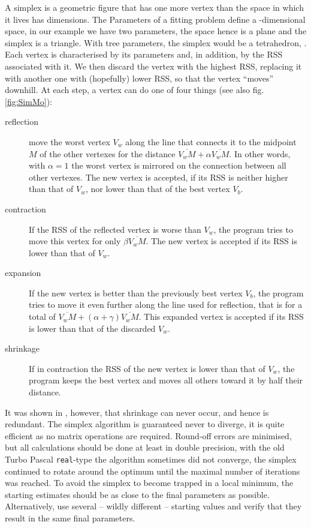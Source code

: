 \begin{refsection}
A simplex is a geometric figure that has one more vertex than the space in which it lives has dimensions. The  Parameters of a fitting problem define a -dimensional space, in our example we have two parameters, the space hence is a plane and the simplex is a triangle. With tree parameters, the simplex would be a tetrahedron, . Each vertex is characterised by its parameters and, in addition, by the \acs{RSS} associated with it. We then discard the vertex with the highest \acs{RSS}, replacing it with another one with (hopefully) lower \acs{RSS}, so that the vertex ``moves'' downhill. At each step, a vertex can do one of four things (see also fig. \ref{fig:SimMo}):
\begin{description}
  \item[reflection]{move the worst vertex \(V_w \) along the line that connects it to the midpoint \(M \) of the other vertexes for the distance \(\overline{V_wM} + \alpha \overline{V_wM} \). In other words, with \(\alpha = 1 \) the worst vertex is mirrored on the connection between all other vertexes. The new vertex is accepted, if its \acs{RSS} is neither higher than that of \(V_w \), nor lower than that of the best vertex \(V_b \). }
  \item[contraction]{If the \acs{RSS} of the reflected vertex is worse than \(V_w \), the program tries to move this vertex for only \(\beta \overline{V_wM} \). The new vertex is accepted if its \acs{RSS} is lower than that of \(V_w \).}
  \item[expansion]{If the new vertex is better than the previously best vertex \(V_b \), the program tries to move it even further along the line used for reflection, that is for a total of \(\overline{V_wM} + (\alpha+\gamma)\overline{V_wM} \). This expanded vertex is accepted if its \acs{RSS} is lower than that of the discarded \(V_w \).}
  \item[shrinkage]{If in contraction the \acs{RSS} of the new vertex is lower than that of \(V_w \), the program keeps the best vertex and moves all others toward it by half their distance. }
\end{description}
It was shown in \parencite{Kim-97}, however, that shrinkage can never occur, and hence is redundant. The simplex algorithm is guaranteed never to diverge, it is quite efficient as no matrix operations are required. Round-off errors are minimised, but all calculations should be done at least in double precision, with the old Turbo Pascal \texttt{real}-type the algorithm sometimes did not converge, the simplex continued to rotate around the optimum until the maximal number of iterations was reached. To avoid the simplex to become trapped in a local minimum, the starting estimates should be as close to the final parameters as possible. Alternatively, use several -- wildly different -- starting values and verify that they result in the same final parameters.


\end{refsection}
